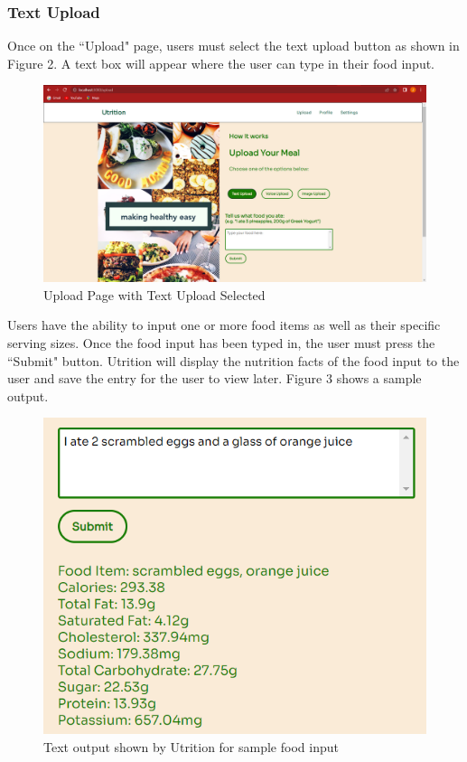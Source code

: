 \documentclass{article}
\begin{document}
\subsubsection{Text Upload}
Once on the ``Upload" page, users must select the text upload button as shown in Figure 2. A text box will appear where the user can type in their food input.
\begin{figure}[H]
	\centering
	\includegraphics[scale=0.30]{textupload.png}
	\caption{Upload Page with Text Upload Selected}
\end{figure}
Users have the ability to input one or more food items as well as their specific serving sizes. Once the food input has been typed in, the user must press the ``Submit" button. Utrition will display the nutrition facts of the food input to the user and save the entry for the user to view later. Figure 3 shows a sample output.
\begin{figure}[H]
	\centering
	\includegraphics[scale=0.70]{sampleoutput.png}
	\caption{Text output shown by Utrition for sample food input}
\end{figure}
\end{document}
